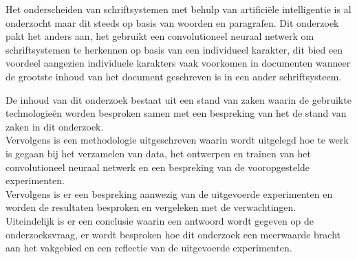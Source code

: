 Het onderscheiden van schriftsystemen met behulp van artificiële intelligentie is al onderzocht maar dit steeds op basis van woorden en paragrafen.
Dit onderzoek pakt het anders aan, het gebruikt een convolutioneel neuraal netwerk om schriftsystemen te herkennen op basis van een individueel karakter, dit bied een voordeel aangezien individuele karakters vaak voorkomen in documenten wanneer de grootste inhoud van het document geschreven is in een ander schriftsysteem.

De inhoud van dit onderzoek bestaat uit een stand van zaken waarin de gebruikte technologieën worden besproken samen met een bespreking van het de stand van zaken in dit onderzoek. \\
Vervolgens is een methodologie uitgeschreven waarin wordt uitgelegd hoe te werk is gegaan bij het verzamelen van data, het ontwerpen en trainen van het convolutioneel neuraal netwerk en een bespreking van de vooropgestelde experimenten. \\
Vervolgens is er een bespreking aanwezig van de uitgevoerde experimenten en worden de resultaten besproken en vergeleken met de verwachtingen. \\
Uiteindelijk is er een conclusie waarin een antwoord wordt gegeven op de onderzoeksvraag, er wordt besproken hoe dit onderzoek een meerwaarde bracht aan het vakgebied en een reflectie van de uitgevoerde experimenten.
